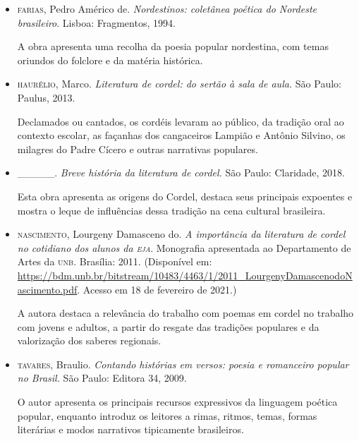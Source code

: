 \documentclass{article}
\begin{document}
\begin{itemize}
\item\textsc{farias}, Pedro Américo de. \textit{Nordestinos: coletânea poética do
  Nordeste brasileiro}. Lisboa: Fragmentos, 1994.

A obra apresenta uma recolha da poesia popular nordestina, com temas
oriundos do folclore e da matéria histórica.

\item\textsc{haurélio}, Marco. \textit{Literatura de cordel: do sertão à sala de
  aula.} São Paulo: Paulus, 2013.

Declamados ou cantados, os cordéis levaram ao público, da tradição oral
ao contexto escolar, as façanhas dos cangaceiros Lampião e Antônio
Silvino, os milagres do Padre Cícero e outras narrativas populares.

\item\_\_\_\_\_. \textit{Breve história da literatura de cordel.} São
  Paulo: Claridade, 2018.

Esta obra apresenta as origens do Cordel, destaca seus principais
expoentes e mostra o leque de influências dessa tradição na cena
cultural brasileira.

\item\textsc{nascimento}, Lourgeny Damasceno do. \textit{A importância da literatura
  de cordel no cotidiano dos alunos da \textsc{eja}}. Monografia apresentada ao
  Departamento de Artes da \textsc{unb}. Brasília: 2011. (Disponível em:
  \url{https://bdm.unb.br/bitstream/10483/4463/1/2011_LourgenyDamascenodoNascimento.pdf}.
  Acesso em 18 de fevereiro de 2021.)

A autora destaca a relevância do trabalho com poemas em cordel no
trabalho com jovens e adultos, a partir do resgate das tradições
populares e da valorização dos saberes regionais.

\item\textsc{tavares}, Braulio. \textit{Contando histórias em versos: poesia e
  romanceiro popular no Brasil.} São Paulo: Editora 34, 2009.

O autor apresenta os principais recursos expressivos da linguagem
poética popular, enquanto introduz os leitores a rimas, ritmos, temas,
formas literárias e modos narrativos tipicamente brasileiros.
\end{itemize}
\end{document}
